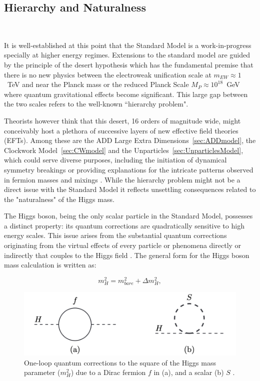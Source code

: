 \subsection{Hierarchy and Naturalness}~\label{sec:HierarchyandNaturalness}

It is well-established at this point that the Standard Model is a work-in-progress specially at higher energy regimes. Extensions to the standard model are guided by the principle of the desert hypothesis which has the fundamental premise that there is no new physics between the electroweak unification scale at $m_{EW}\approx1$~TeV and near the Planck mass or the reduced Planck Scale $M_P\approx 10^{18}$~GeV where quantum gravitational effects become significant. This large gap between the two scales refers to the well-known ``hierarchy problem". 

Theorists however think that this desert, 16 orders of magnitude wide, might conceivably host a plethora of successive layers of new effective field theories (EFTs). Among these are the ADD Large Extra Dimensions~\ref{sec:ADDmodel}, the Clockwork Model~\ref{sec:CWmodel} and the Unparticles~\ref{sec:UnparticlesModel}, which could serve diverse purposes, including the initiation of dynamical symmetry breakings or providing explanations for the intricate patterns observed in fermion masses and mixings \cite{Arkani-Hamed:1998jmv}. While the hierarchy problem might not be a direct issue with the Standard Model it reflects unsettling consequences related to the "naturalness" of the Higgs mass. 

The Higgs boson, being the only scalar particle in the Standard Model, possesses a distinct property: its quantum corrections are quadratically sensitive to high energy scales. This issue arises from the substantial quantum corrections originating from the virtual effects of every particle or phenomena directly or indirectly that couples to the Higgs field \cite{Martin:1997ns}. The general form for the Higgs boson mass calculation is written as:

\begin{equation}
    \label{eq:HiggsMass}
    m^2_H = m^2_{bare} + \Delta m^2_{H}, 
\end{equation}

\begin{figure}[!htbp]
	\centering  
    \includegraphics[scale=1.0]{fig/LoopCorrHiggs.png}
	\caption{One-loop quantum corrections to the square of the Higgs mass parameter ($m^2_{H}$) due to a Dirac fermion $f$ in (a), and a scalar (b) $S$ \cite{Martin:1997ns}. }
	  \label{fig:HiggsQuantumCorr}
\end{figure}

